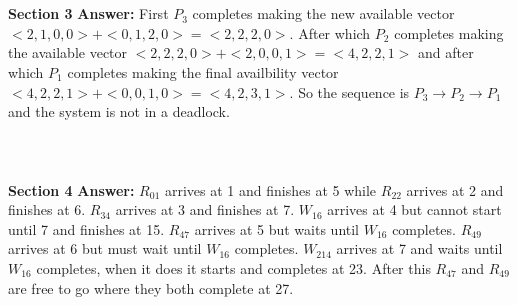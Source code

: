 \documentclass[12pt]{article}
\begin{document}
\\\\ \textbf{Section 3}
\textbf{Answer: } First $P_3$ completes making the new available vector $<2,1,0,0>+<0,1,2,0>=<2,2,2,0>$.
After which $P_2$ completes making the available vector $<2,2,2,0>+<2,0,0,1>=<4,2,2,1>$ and after which 
$P_1$ completes making the final availbility vector $<4,2,2,1>+<0,0,1,0>=<4,2,3,1>$. So the sequence is 
$P_3 \rightarrow P_2 \rightarrow P_1$ and the system is not in a deadlock.
\\\\
\\\\ \textbf{Section 4}
\textbf{Answer: } $R_{01}$ arrives at 1 and finishes at 5 while $R_{22}$ arrives at 2 and finishes 
at 6. $R_{34}$ arrives at 3 and finishes at 7.  $W_{16}$ arrives at 4 but cannot start until 7 and 
finishes at 15. $R_{47}$ arrives at 5 but waits until $W_{16}$ completes. $R_{49}$ arrives at 6 but 
must wait until $W_{16}$ completes. $W_{214}$ arrives at 7 and waits until $W_{16}$ completes, when it 
does it starts and completes at 23. After this $R_{47}$ and $R_{49}$ are free to go where they 
both complete at 27.
\\\\
\end{document}
